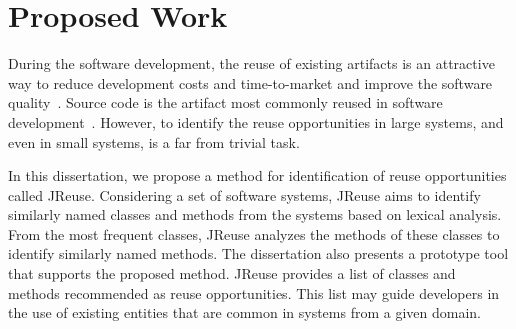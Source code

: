 \section{Proposed Work}
\label{sec:proposedWork}


During the software development, the reuse of existing artifacts is an attractive way to reduce development costs and time-to-market and improve the software quality~\citep{mohagheghi2007quality}.  Source code is the artifact most commonly reused in software development~\citep{morisio:2002}.  However, to identify the reuse opportunities in large systems, and even in small systems, is a far from trivial task.


In this dissertation, we propose a method for identification  of reuse opportunities called JReuse. Considering a set of software systems, JReuse aims to identify similarly named classes and methods from the systems based on lexical analysis. From the most frequent classes, JReuse analyzes the methods of these classes to identify similarly named methods. The dissertation also presents a prototype tool that supports the proposed method. JReuse provides a list of classes and methods recommended as reuse opportunities. This list may guide developers in the use of existing entities that are common in systems from a given domain. %

